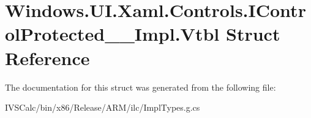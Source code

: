 \hypertarget{struct_windows_1_1_u_i_1_1_xaml_1_1_controls_1_1_i_control_protected_____impl_1_1_vtbl}{}\section{Windows.\+U\+I.\+Xaml.\+Controls.\+I\+Control\+Protected\+\_\+\+\_\+\+Impl.\+Vtbl Struct Reference}
\label{struct_windows_1_1_u_i_1_1_xaml_1_1_controls_1_1_i_control_protected_____impl_1_1_vtbl}


The documentation for this struct was generated from the following file\+:\begin{DoxyCompactItemize}
\item 
I\+V\+S\+Calc/bin/x86/\+Release/\+A\+R\+M/ilc/Impl\+Types.\+g.\+cs\end{DoxyCompactItemize}
